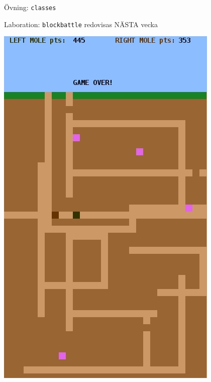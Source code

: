 

\ifkompendium\else

\begin{SlideExtra}{Övning: \texttt{classes}}
\begin{itemize}\SlideFontSmall

\end{itemize}
\end{SlideExtra}

\begin{SlideExtra}{Laboration: \texttt{blockbattle} redovisas NÄSTA vecka}
  \begin{minipage}{0.42\textwidth}
        \includegraphics[height=0.8\textheight]{../img/blockbattle.png}
  \end{minipage}%
  \begin{minipage}{0.59\textwidth}

\end{minipage}
\end{SlideExtra}
